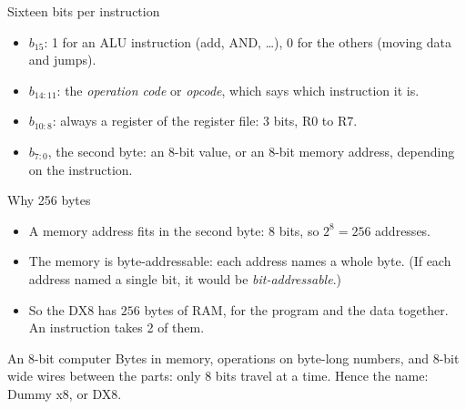 \documentclass[10pt]{wosm-slides}
\newcommand*\bitrow[2]{%
  \foreach \b [count=\i from 0] in {#2}
    {\node[font=\small] at (\i*0.55+0.275,#1) {\b};}}
\newcommand*\fields[2]{%
  \draw[wosm-text, line width=0.6pt] (0,#1) rectangle (8.8,#2);
  \foreach \x in {1,...,15} {\draw[wosm-rule, line width=0.4pt] (\x*0.55,#1) --
    (\x*0.55,#2);}
  \foreach \x in {0.55,2.75,4.4} {\draw[wosm-text, line width=1pt] (\x,#1) --
    (\x,#2);}}
\begin{document}
\begin{frame}{Sixteen bits per instruction}
  \begin{center}
  \end{center}

  \begin{itemize}
    \item $b_{15}$: 1 for an ALU instruction (add, AND, \ldots), 0 for the others
      (moving data and jumps).
    \item $b_{14:11}$: the \emph{operation code} or \emph{opcode}, which says which
      instruction it is.
    \item $b_{10:8}$: always a register of the register file: 3 bits, R0 to R7.
    \item $b_{7:0}$, the second byte: an 8-bit value, or an 8-bit memory address,
      depending on the instruction.
  \end{itemize}
\end{frame}

\begin{frame}{Why 256 bytes}
  \begin{itemize}
    \item A memory address fits in the second byte: 8 bits, so
      $2^8 = 256$ addresses.
    \item The memory is \alert{byte-addressable}: each address names a whole byte.
      (If each address named a single bit, it would be \emph{bit-addressable}.)
    \item So the DX8 has $256$ bytes of RAM, for the program and the data together.
      An instruction takes 2 of them.
  \end{itemize}

  \begin{block}{An 8-bit computer}
    Bytes in memory, operations on byte-long numbers, and 8-bit wide wires between
    the parts: only 8 bits travel at a time. Hence the name: Dummy x8, or DX8.
  \end{block}
\end{frame}
\end{document}
